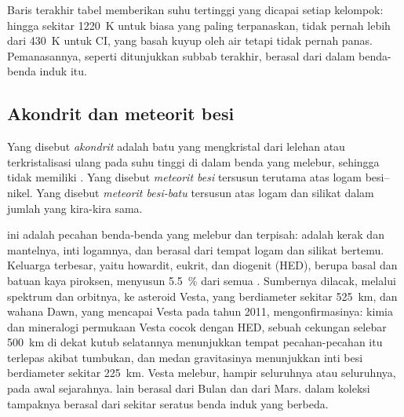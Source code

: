 Baris terakhir tabel memberikan suhu tertinggi yang dicapai setiap kelompok:
hingga sekitar \qty{1220}{K} untuk  biasa yang paling terpanaskan, tidak pernah lebih
dari \qty{430}{K} untuk  CI, yang basah kuyup oleh air tetapi tidak pernah panas.
Pemanasannya, seperti ditunjukkan subbab terakhir, berasal dari dalam benda-benda induk itu.

\subsection{Akondrit dan meteorit besi}

\begin{definition}
\label{def:b2:planet-formation-meteorites:classes}
Yang disebut \emph{akondrit} adalah  batu yang mengkristal
dari lelehan atau terkristalisasi ulang pada suhu tinggi di dalam benda yang melebur,
sehingga tidak memiliki . Yang disebut \emph{meteorit besi} tersusun
terutama atas logam besi--nikel. Yang disebut \emph{meteorit
besi-batu} tersusun atas logam dan silikat dalam jumlah yang
kira-kira sama.
\end{definition}

 ini adalah pecahan benda-benda yang melebur dan terpisah:  adalah
kerak dan mantelnya,  inti logamnya, dan  berasal dari tempat
logam dan silikat bertemu. Keluarga  terbesar, yaitu howardit,
eukrit, dan diogenit (HED), berupa basal dan batuan kaya piroksen, menyusun
\qty{5.5}{\percent} dari semua . Sumbernya dilacak, melalui spektrum dan
orbitnya, ke asteroid Vesta, yang berdiameter sekitar \qty{525}{km}, dan wahana
Dawn, yang mencapai Vesta pada tahun 2011, mengonfirmasinya: kimia
dan mineralogi permukaan Vesta cocok dengan  HED, sebuah cekungan
selebar \qty{500}{km} di dekat kutub selatannya menunjukkan tempat pecahan-pecahan itu terlepas
akibat tumbukan, dan medan gravitasinya menunjukkan inti besi berdiameter sekitar \qty{225}{km}.
Vesta melebur, hampir seluruhnya atau seluruhnya, pada awal sejarahnya.  lain berasal
dari Bulan dan dari Mars.  dalam koleksi tampaknya berasal
dari sekitar seratus benda induk yang berbeda.

